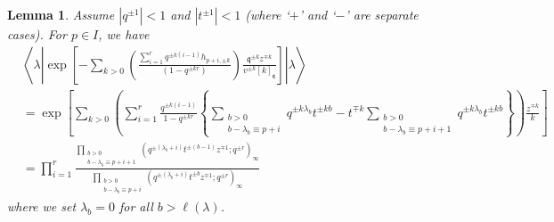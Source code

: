 \documentclass{amsart}
\newcommand{\qqq}{\mathfrak{q}}
\newtheorem{lem}[thm]{Lemma}
\theoremstyle{remark}
\numberwithin{thm}{section}
\numberwithin{equation}{section}
\begin{document}
\begin{lem}\label{NSFockEigen}
Assume $|q^{\pm 1}|<1$ and $|t^{\pm 1}|<1$ (where `$+$' and `$-$' are separate cases).
For $p\in I$, we have
\begin{equation}
\begin{aligned}
&\left\langle\lambda\left|\exp\left[-\sum_{k>0}\left(\frac{\sum_{i=1}^{r}q^{\pm k(i-1)}h_{p+i,\pm k}}{(1-q^{\pm kr})}\right)\frac{\qqq^{\pm k} z^{\mp k}}{v^{\pm k}[ k]_{\qqq}} \right]\right|\lambda\right\rangle\\
&= \exp\left[\sum_{k>0}\left(\sum_{i=1}^{r}\frac{q^{\pm k(i-1)}}{1-q^{\pm kr}}\left\{\sum_{\substack{b>0\\b-\lambda_b\equiv p+i }}q^{\pm k\lambda_b}t^{\pm kb}-t^{\mp k}\sum_{\substack{b>0\\b-\lambda_b\equiv p+i+1 }}q^{\pm k\lambda_b}t^{\pm kb}\right\}\right)\frac{z^{\mp k}}{k}\right]\\
&= \prod_{i=1}^{r}
\frac{\displaystyle\prod_{\substack{b>0\\b-\lambda_b\equiv p+i+1 }}\left(q^{\pm(\lambda_b+i)}t^{\pm (b- 1)}z^{\mp 1}; q^{\pm r}\right)_\infty}
{\displaystyle\prod_{\substack{b>0\\b-\lambda_b\equiv p+i }}\left(q^{\pm(\lambda_b+i)}t^{\pm b}z^{\mp 1}; q^{\pm r}\right)_\infty}
\end{aligned}
\label{NSEigenLemma}
\end{equation}
where we set $\lambda_b=0$ for all $b>\ell(\lambda)$.
\end{lem}
\end{document}
